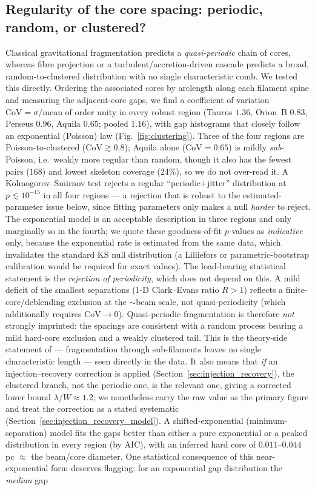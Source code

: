 \documentclass[usenatbib,twoside,twocolumn]{mnras}
\begin{document}
\subsection{Regularity of the core spacing: periodic, random, or clustered?}
\label{sec:clustering}
Classical gravitational fragmentation predicts a \emph{quasi-periodic} chain of cores, whereas fibre projection or a turbulent/accretion-driven cascade predicts a broad, random-to-clustered distribution with no single characteristic comb. We tested this directly. Ordering the associated cores by arclength along each filament spine and measuring the adjacent-core gaps, we find a coefficient of variation $\mathrm{CoV}=\sigma/\mathrm{mean}$ of order unity in every robust region (Taurus $1.36$, Orion~B $0.83$, Perseus $0.96$, Aquila $0.65$; pooled $1.16$), with gap histograms that closely follow an exponential (Poisson) law (Fig.~\ref{fig:clustering}). Three of the four regions are Poisson-to-clustered ($\mathrm{CoV}\gtrsim0.8$); Aquila alone ($\mathrm{CoV}=0.65$) is mildly \emph{sub}-Poisson, i.e.\ weakly more regular than random, though it also has the fewest pairs ($168$) and lowest skeleton coverage ($24\%$), so we do not over-read it. A Kolmogorov--Smirnov test rejects a regular ``periodic$+$jitter'' distribution at $p\lesssim10^{-15}$ in all four regions --- a rejection that is robust to the estimated-parameter issue below, since fitting parameters only makes a null \emph{harder} to reject. The exponential model is an acceptable description in three regions and only marginally so in the fourth; we quote these goodness-of-fit $p$-values as \emph{indicative} only, because the exponential rate is estimated from the same data, which invalidates the standard KS null distribution (a Lilliefors or parametric-bootstrap calibration would be required for exact values). The load-bearing statistical statement is the \emph{rejection of periodicity}, which does not depend on this. A mild deficit of the smallest separations (1-D Clark--Evans ratio $R>1$) reflects a finite-core/deblending exclusion at the $\sim$beam scale, not quasi-periodicity (which additionally requires $\mathrm{CoV}\!\to\!0$). Quasi-periodic fragmentation is therefore \emph{not} strongly imprinted: the spacings are consistent with a random process bearing a mild hard-core exclusion and a weakly clustered tail. This is the theory-side statement of \citet{Clarke2020} --- fragmentation through sub-filaments leaves no single characteristic length --- seen directly in the data. It also means that \emph{if} an injection--recovery correction is applied (Section~\ref{sec:injection_recovery}), the clustered branch, not the periodic one, is the relevant one, giving a corrected lower bound $\lambda/W\approx1.2$; we nonetheless carry the raw value as the primary figure and treat the correction as a stated systematic (Section~\ref{sec:injection_recovery_model}). A shifted-exponential (minimum-separation) model fits the gaps better than either a pure exponential or a peaked distribution in every region (by AIC), with an inferred hard core of $0.011$--$0.044$\,pc $\approx$ the beam/core diameter. One statistical consequence of this near-exponential form deserves flagging: for an exponential gap distribution the \emph{median} gap 
\end{document}
